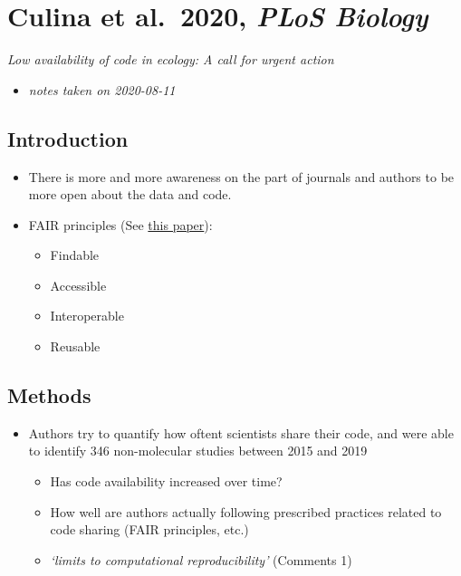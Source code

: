 \documentclass[
]{book}
\providecommand{\tightlist}{%
  \setlength{\itemsep}{0pt}\setlength{\parskip}{0pt}}
\begin{document}
\hypertarget{culina-et-al.-2020-plos-biology}{%
\chapter{\texorpdfstring{Culina et al.~2020, \emph{PLoS Biology}}{Culina et al.~2020, PLoS Biology}}\label{culina-et-al.-2020-plos-biology}}


\emph{Low availability of code in ecology: A call for urgent action} \citep{culina2020low}

\begin{itemize}
\tightlist
\item
  \emph{notes taken on 2020-08-11}
\end{itemize}

\hypertarget{introduction}{%
\section{Introduction}\label{introduction}}

\begin{itemize}
\tightlist
\item
  There is more and more awareness on the part of journals and authors to be more open about the data and code.
\item
  FAIR principles (See \href{https://www.nature.com/articles/sdata201618}{this paper}):

  \begin{itemize}
  \tightlist
  \item
    Findable
  \item
    Accessible
  \item
    Interoperable
  \item
    Reusable
  \end{itemize}
\end{itemize}

\hypertarget{methods}{%
\section{Methods}\label{methods}}

\begin{itemize}
\tightlist
\item
  Authors try to quantify how oftent scientists share their code, and were able to identify 346 non-molecular studies between 2015 and 2019

  \begin{itemize}
  \tightlist
  \item
    Has code availability increased over time?
  \item
    How well are authors actually following prescribed practices related to code sharing (FAIR principles, etc.)
  \item
    \emph{`limits to computational reproducibility'} (\protect\hypertarget{comments_culina}{}{Comments 1})
  \end{itemize}
\end{itemize}
\end{document}
